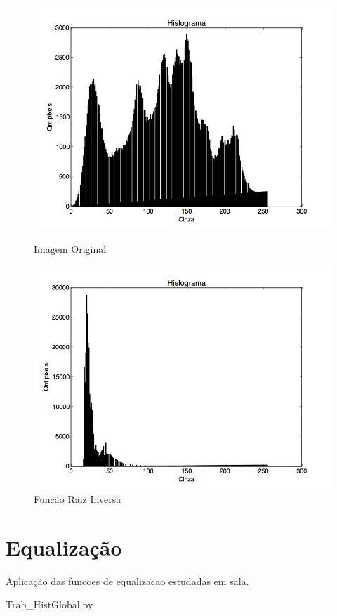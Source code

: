 \documentclass{article}
\begin{document}
\FloatBarrier
\begin{figure}[!htb]
\begin{minipage}[b]{0.45\linewidth}
\centering
\includegraphics[scale=0.25]{Histo_lena_B.jpg}
\caption{Imagem Original}
\label{fig:original}
\end{minipage}
\hspace{0.5cm}
\begin{minipage}[b]{0.45\linewidth}
\centering
\includegraphics[scale=0.25]{Histo_TransNLinearRootInv.jpg}
\caption{Funcão Raiz Inversa}
\label{fig:rota}
\end{minipage}
\end{figure}
\FloatBarrier

\newpage
\section{Equalização}
Aplicação das funcoes de equalizacao estudadas em sala.

{Trab_HistGlobal.py}
\end{document}
